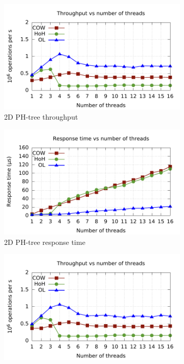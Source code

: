 \documentclass[11pt,a4paper]{globis-book}
\begin{document}
\begin{figure}
    \begin{subfigure}[b]{0.5\linewidth}
        \includegraphics[scale=0.5]{images/plots/insert2d-tp}
        \caption{2D PH-tree throughput}
    \end{subfigure}%
    \begin{subfigure}[b]{0.5\linewidth}
        \includegraphics[scale=0.5]{images/plots/insert2d-rt}
        \caption{2D PH-tree response time}
    \end{subfigure}
    \begin{subfigure}[b]{0.5\linewidth}
        \includegraphics[scale=0.5]{images/plots/insert3d-tp}

\end{subfigure}
\end{figure}
\end{document}
